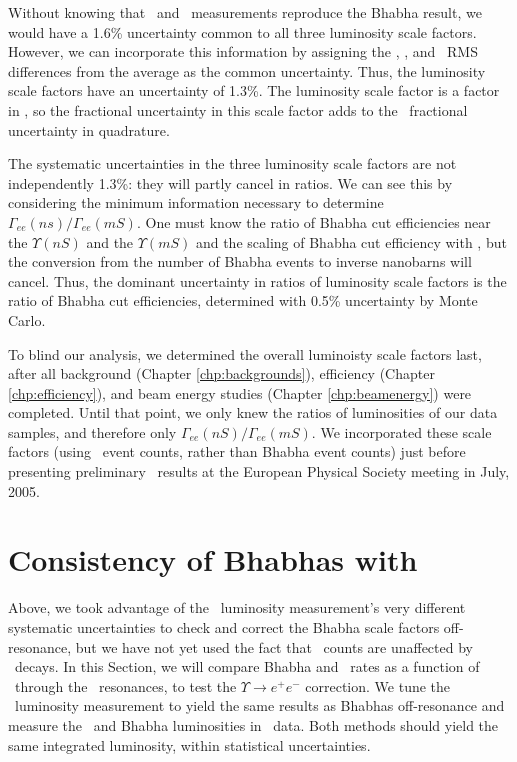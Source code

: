 \documentclass{cornell}
\begin{document}
Without knowing that \mumu\ and \gamgam\ measurements reproduce the
Bhabha result, we would have a 1.6\% uncertainty common to all three
luminosity scale factors.  However, we can incorporate this
information by assigning the \ee, \mumu, and \gamgam\ RMS differences
from the average as the common uncertainty.  Thus, the luminosity
scale factors have an uncertainty of 1.3\%.  \label{sec:luminosity}
The luminosity scale factor is a factor in \geehadtot, so the
fractional uncertainty in this scale factor adds to the \geehadtot\
fractional uncertainty in quadrature.

The systematic uncertainties in the three luminosity scale factors are
not independently 1.3\%: they will partly cancel in ratios.  We can
see this by considering the minimum information necessary to determine
$\Gamma_{ee}(ns)/\Gamma_{ee}(mS)$.  One must know the ratio of Bhabha
cut efficiencies near the $\Upsilon(nS)$ and the $\Upsilon(mS)$ and
the scaling of Bhabha cut efficiency with \ecm, but the conversion
from the number of Bhabha events to inverse nanobarns will cancel.
Thus, the dominant uncertainty in ratios of luminosity scale factors
is the ratio of Bhabha cut efficiencies, determined with 0.5\%
uncertainty by Monte Carlo.

To blind our analysis, we determined the overall luminoisty scale
factors last, after all background (Chapter \ref{chp:backgrounds}),
efficiency (Chapter \ref{chp:efficiency}), and beam energy studies
(Chapter \ref{chp:beamenergy}) were completed.  Until that point, we
only knew the ratios of luminosities of our data samples, and
therefore only $\Gamma_{ee}(nS)/\Gamma_{ee}(mS)$.  We incorporated
these scale factors (using \gamgam\ event counts, rather than Bhabha
event counts) just before presenting preliminary \gee\ results at the
European Physical Society meeting in July, 2005.

\section{Consistency of Bhabhas with \boldmath \gamgam}

Above, we took advantage of the \gamgam\ luminosity measurement's very
different systematic uncertainties to check and correct the Bhabha
scale factors off-resonance, but we have not yet used the fact that
\gamgam\ counts are unaffected by \ups\ decays.  In this Section, we
will compare Bhabha and \gamgam\ rates as a function of \ecm\ through
the \ups\ resonances, to test the $\Upsilon \to e^+e^-$ correction.
We tune the \gamgam\ luminosity measurement to yield the same results
as Bhabhas off-resonance and measure the \gamgam\ and Bhabha
luminosities in \ups\ data.  Both methods should yield the same
integrated luminosity, within statistical uncertainties.
\end{document}
